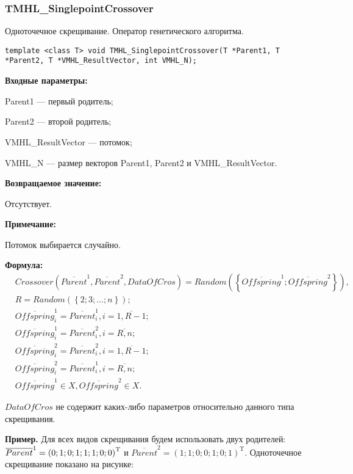 \documentclass[a4paper,12pt]{article}
\begin{document}
\subsubsection{TMHL\_SinglepointCrossover}\label{TMHL_SinglepointCrossover}

Одноточечное скрещивание. Оператор генетического алгоритма.


\begin{lstlisting}[label=code_syntax_TMHL_SinglepointCrossover,caption=Синтаксис]
template <class T> void TMHL_SinglepointCrossover(T *Parent1, T *Parent2, T *VMHL_ResultVector, int VMHL_N);
\end{lstlisting}

\textbf{Входные параметры:}
 
Parent1 --- первый родитель;
 
Parent2 --- второй родитель;
 
VMHL\_ResultVector --- потомок;
 
VMHL\_N --- размер векторов Parent1, Parent2 и VMHL\_ResultVector.

\textbf{Возвращаемое значение:}

 Отсутствует.
 
\textbf{ Примечание:}

 Потомок выбирается случайно.
 
 \textbf{Формула:}
\begin{align}
&Crossover \left( \overline{Parent}^1, \overline{Parent}^2, DataOfCros\right)=Random \left(\left\lbrace \overline{Offspring}^1; \overline{Offspring}^2\right\rbrace  \right), \nonumber\\
&R=Random\left( \left\lbrace 2; 3; \ldots; n\right\rbrace \right); \nonumber \\
& \overline{Offspring}^1_i=\overline{Parent}^1_i, i=\overline{1,R-1};\nonumber\\
&  \overline{Offspring}^1_i=\overline{Parent}^2_i, i=\overline{R,n};\nonumber\\
&\overline{Offspring}^2_i=\overline{Parent}^2_i, i=\overline{1,R-1};\nonumber\\
& \overline{Offspring}^2_i=\overline{Parent}^1_i, i=\overline{R,n};\nonumber\\
&\overline{Offspring}^1\in X, \overline{Offspring}^2\in X.\nonumber
\end{align}

$ DataOfCros $ не содержит каких-либо параметров относительно данного типа скрещивания.

\textbf{Пример.} Для всех видов скрещивания будем использовать двух родителей: $\overline{Parent}^1\hm={\left( 0; 1; 0; 1; 1; 1; 0; 0\right)}^\mathrm{T}  $ и $\overline{Parent}^2={\left( 1; 1; 0; 0; 1; 0; 1\right)}^\mathrm{T}  $. Одноточечное скрещивание показано на рисунке:
\end{document}
